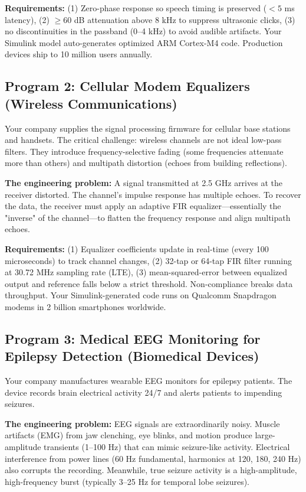 \documentclass[11pt,letterpaper]{article}
\begin{document}
\textbf{Requirements:} (1) Zero-phase response so speech timing is preserved ($< 5$ ms latency), (2) $\geq 60$ dB attenuation above 8 kHz to suppress ultrasonic clicks, (3) no discontinuities in the passband (0--4 kHz) to avoid audible artifacts. Your Simulink model auto-generates optimized ARM Cortex-M4 code. Production devices ship to 10 million users annually.

\subsection{Program 2: Cellular Modem Equalizers (Wireless Communications)}

Your company supplies the signal processing firmware for cellular base stations and handsets. The critical challenge: wireless channels are not ideal low-pass filters. They introduce frequency-selective fading (some frequencies attenuate more than others) and multipath distortion (echoes from building reflections).

\textbf{The engineering problem:} A signal transmitted at 2.5 GHz arrives at the receiver distorted. The channel's impulse response has multiple echoes. To recover the data, the receiver must apply an adaptive FIR equalizer—essentially the "inverse" of the channel—to flatten the frequency response and align multipath echoes.

\textbf{Requirements:} (1) Equalizer coefficients update in real-time (every 100 microseconds) to track channel changes, (2) 32-tap or 64-tap FIR filter running at 30.72 MHz sampling rate (LTE), (3) mean-squared-error between equalized output and reference falls below a strict threshold. Non-compliance breaks data throughput. Your Simulink-generated code runs on Qualcomm Snapdragon modems in 2 billion smartphones worldwide.

\subsection{Program 3: Medical EEG Monitoring for Epilepsy Detection (Biomedical Devices)}

Your company manufactures wearable EEG monitors for epilepsy patients. The device records brain electrical activity 24/7 and alerts patients to impending seizures.

\textbf{The engineering problem:} EEG signals are extraordinarily noisy. Muscle artifacts (EMG) from jaw clenching, eye blinks, and motion produce large-amplitude transients (1--100 Hz) that can mimic seizure-like activity. Electrical interference from power lines (60 Hz fundamental, harmonics at 120, 180, 240 Hz) also corrupts the recording. Meanwhile, true seizure activity is a high-amplitude, high-frequency burst (typically 3--25 Hz for temporal lobe seizures).
\end{document}
